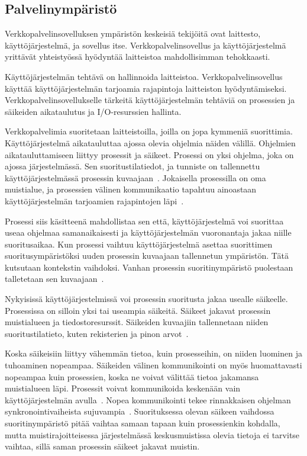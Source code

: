 \documentclass[finnish]{tktltiki2}
\theoremstyle{definition}
\theoremstyle{remark}
\begin{document}
\subsection{Palvelinympäristö}
Verkkopalvelinsovelluksen ympäristön keskeisiä
tekijöitä ovat laittesto, käyttöjärjestelmä, ja sovellus itse.
Verkkopalvelinsovellus ja käyttöjärjestelmä
yrittävät yhteistyössä hyödyntää laitteistoa
mahdollisimman tehokkaasti.

Käyttöjärjestelmän tehtävä on hallinnoida laitteistoa.
Verkkopalvelinsovellus käyttää käyttöjärjestelmän
tarjoamia rajapintoja laitteiston hyödyntämiseksi.
Verkkopalvelinsovellukselle tärkeitä
käyttöjärjestelmän tehtäviä on 
prosessien ja säikeiden aikataulutus ja I/O-resurssien hallinta.

Verkkopalvelimia suoritetaan laitteistoilla, joilla
on jopa kymmeniä suorittimia. Käyttöjärjestelmä
aikatauluttaa ajossa olevia ohjelmia näiden välillä.
Ohjelmien aikatauluttamiseen liittyy prosessit ja säikeet.
Prosessi on yksi ohjelma, joka on ajossa järjestelmässä. Sen suoritustilatiedot, ja tunniste on
tallennettu käyttöjärjestelmässä prosessin kuvaajaan~\cite{stallings_operating_2018}.
Jokaisella
prosessilla on oma muistialue, ja prosessien välinen kommunikaatio
tapahtuu ainoastaan käyttöjärjestelmän tarjoamien
rajapintojen läpi~\cite{stallings_operating_2018}.

Prosessi siis käsitteenä mahdollistaa sen että, käyttöjärjestelmä
voi suorittaa useaa ohjelmaa samanaikaisesti ja käyttöjärjestelmän
vuoronantaja jakaa niille suoritusaikaa. Kun prosessi vaihtuu
käyttöjärjestelmä asettaa suorittimen suoritusympäristöksi
uuden prosessin kuvaajaan tallennetun ympäristön. Tätä kutsutaan kontekstin
vaihdoksi. Vanhan prosessin suoritinympäristö puolestaan talletetaan sen
kuvaajaan~\cite{stallings_operating_2018}.

Nykyisissä käyttöjärjestelmissä voi prosessin suoritusta jakaa usealle
säikeelle. Prosessissa on silloin yksi tai useampia säikeitä.
Säikeet jakavat prosessin muistialueen ja tiedostoresurssit.
Säikeiden kuvaajiin
tallennetaan niiden suoritustilatieto,
kuten rekisterien ja pinon arvot~\cite{stallings_operating_2018}.

Koska säikeisiin liittyy vähemmän tietoa, kuin prosesseihin,
on niiden luominen ja tuhoaminen nopeampaa. Säikeiden välinen
kommunikointi on myös huomattavasti nopeampaa kuin prosessien, koska
ne voivat välittää tietoa jakamansa muistialueen läpi.
Prosessit voivat kommunikoida keskenään vain käyttöjärjestelmän
avulla~\cite{stallings_operating_2018}.
Nopea %
kommunikointi tekee rinnakkaisen ohjelman synkronointivaiheista
sujuvampia~\cite{stallings_operating_2018}.
Suorituksessa olevan säikeen
vaihdossa suoritinympäristö pitää vaihtaa
samaan tapaan kuin prosessienkin kohdalla, mutta muistirajoitteisessa
järjestelmässä keskusmuistissa olevia
tietoja ei tarvitse vaihtaa, sillä saman prosessin säikeet jakavat
muistin.
\end{document}
